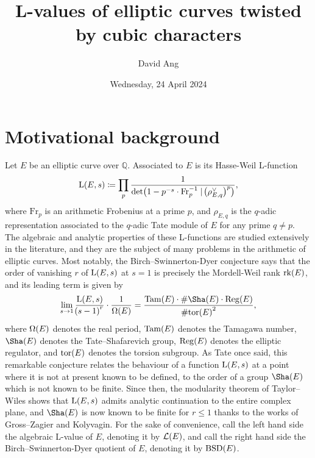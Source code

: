 \documentclass{article}
\title{L-values of elliptic curves twisted by cubic characters}
\author{David Ang}
\date{Wednesday, 24 April 2024}
\theoremstyle{plain}
\theoremstyle{definition}
\newcommand{\BSD}{\mathrm{BSD}}
\newcommand{\Fr}{\mathrm{Fr}}
\renewcommand{\L}{\mathrm{L}}
\newcommand{\LLL}{\mathcal{L}}
\newcommand{\QQ}{\mathbb{Q}}
\newcommand{\Reg}{\mathrm{Reg}}
\newcommand{\rk}{\mathrm{rk}}
\newcommand{\Tam}{\mathrm{Tam}}
\newcommand{\tor}{\mathrm{tor}}
\newcommand{\br}{\!\del}
\begin{document}
\maketitle

\section{Motivational background}

Let $ E $ be an elliptic curve over $ \QQ $. Associated to $ E $ is its Hasse-Weil L-function
$$ \L\br{E, s} \coloneqq \prod_p \dfrac{1}{\det\br[1]{1 - p^{-s} \cdot \Fr_p^{-1} \mid \br[1]{\rho_{E, q}^\vee}^p}}, $$
where $ \Fr_p $ is an arithmetic Frobenius at a prime $ p $, and $ \rho_{E, q} $ is the $ q $-adic representation associated to the $ q $-adic Tate module of $ E $ for any prime $ q \ne p $. The algebraic and analytic properties of these L-functions are studied extensively in the literature, and they are the subject of many problems in the arithmetic of elliptic curves. Most notably, the Birch--Swinnerton-Dyer conjecture says that the order of vanishing $ r $ of $ \L\br{E, s} $ at $ s = 1 $ is precisely the Mordell-Weil rank $ \rk\br{E} $, and its leading term is given by
$$ \lim_{s \to 1} \dfrac{\L\br{E, s}}{\br{s - 1}^r} \cdot \dfrac{1}{\Omega\br{E}} = \dfrac{\Tam\br{E} \cdot \#\Sha\br{E} \cdot \Reg\br{E}}{\#\tor\br{E}^2}, $$
where $ \Omega\br{E} $ denotes the real period, $ \Tam\br{E} $ denotes the Tamagawa number, $ \Sha\br{E} $ denotes the Tate--Shafarevich group, $ \Reg\br{E} $ denotes the elliptic regulator, and $ \tor\br{E} $ denotes the torsion subgroup. As Tate once said, this remarkable conjecture relates the behaviour of a function $ \L\br{E, s} $ at a point where it is not at present known to be defined, to the order of a group $ \Sha\br{E} $ which is not known to be finite. Since then, the modularity theorem of Taylor--Wiles shows that $ \L\br{E, s} $ admits analytic continuation to the entire complex plane, and $ \Sha\br{E} $ is now known to be finite for $ r \le 1 $ thanks to the works of Gross--Zagier and Kolyvagin. For the sake of convenience, call the left hand side the algebraic L-value of $ E $, denoting it by $ \LLL\br{E} $, and call the right hand side the Birch--Swinnerton-Dyer quotient of $ E $, denoting it by $ \BSD\br{E} $.
\end{document}
